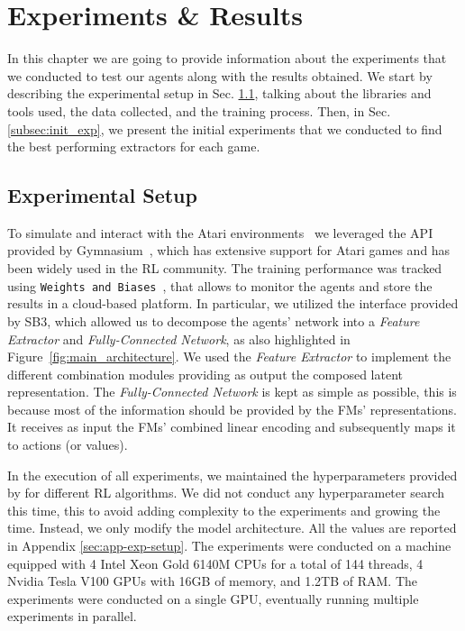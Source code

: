 
\chapter{Experiments \& Results}
\label{ch:experiments_and_results}
In this chapter we are going to provide information about the experiments that we conducted to test our agents along with the results obtained.
We start by describing the experimental setup in Sec. \ref{sec:exp_setup}, talking about the libraries and tools used, the data collected, and the training process.
Then, in Sec. \ref{subsec:init_exp}, we present the initial experiments that we conducted to find the best performing extractors for each game.

\section{Experimental Setup}\label{sec:exp_setup}
To simulate and interact with the Atari environments~\citep{bellemare2013atari} we leveraged the API provided by Gymnasium~\citep{towers_gymnasium_2023}, which has extensive support for Atari games and has been widely used in the RL community.
The training performance was tracked using \texttt{Weights and Biases}~\citep{wandb}, that allows to monitor the agents and store the results in a cloud-based platform.
In particular, we utilized the interface provided by SB3, which allowed us to decompose the agents' network into a \textit{Feature Extractor} and \textit{Fully-Connected Network}, as also highlighted in Figure~\ref{fig:main_architecture}.
We used the \textit{Feature Extractor} to implement the different combination modules providing as output the composed latent representation.
The \textit{Fully-Connected Network} is kept as simple as possible, this is because most of the information should be provided by the FMs' representations.
It receives as input the FMs' combined linear encoding and subsequently maps it to actions (or values).

In the execution of all experiments, we maintained the hyperparameters provided by \citet{rl-zoo3} for different RL algorithms.
We did not conduct any hyperparameter search this time, this to avoid adding complexity to the experiments and growing the time.
Instead, we only modify the model architecture.
All the values are reported in Appendix \ref{sec:app-exp-setup}.
The experiments were conducted on a machine equipped with 4 Intel Xeon Gold 6140M CPUs for a total of 144 threads, 4 Nvidia Tesla V100 GPUs with 16GB of memory, and 1.2TB of RAM.
The experiments were conducted on a single GPU, eventually running multiple experiments in parallel.


